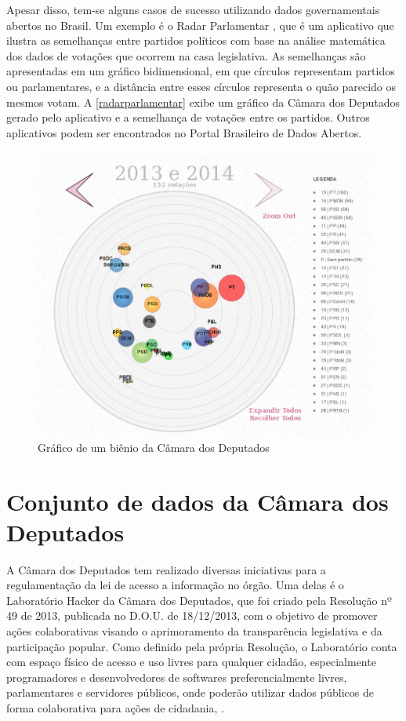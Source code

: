 \documentclass[
	12pt,				%
	openright,			%
	twoside,			%
	a4paper,			%
	english,			%
	french,				%
	spanish,			%
	brazil				%
	]{abntex2}
\begin{document}
Apesar disso, tem-se alguns casos de sucesso utilizando dados governamentais abertos no Brasil. Um exemplo é o Radar Parlamentar
, que é um aplicativo que ilustra as semelhanças entre partidos políticos com base na análise matemática dos 
dados de votações que ocorrem na casa legislativa. As semelhanças são apresentadas em um gráfico bidimensional, em que círculos 
representam partidos ou parlamentares, e a distância entre esses círculos representa o quão parecido os mesmos votam. A 
\autoref{radarparlamentar} exibe um gráfico da Câmara dos Deputados gerado pelo aplicativo e a semelhança de votações entre os
partidos. Outros aplicativos podem ser encontrados no Portal Brasileiro de Dados Abertos.

\begin{figure}[htb]
	\caption{\label{radarparlamentar}Gráfico de um biênio da Câmara dos Deputados}
	\begin{center}
	    \includegraphics[scale=0.5]{radarparlamentar.png}
	\end{center}
\end{figure}

\chapter{Conjunto de dados da Câmara dos Deputados} 
A Câmara dos Deputados tem realizado diversas iniciativas para a regulamentação da lei de acesso a informação no órgão. 
Uma delas é o Laboratório Hacker da Câmara dos Deputados, que foi criado pela Resolução nº 49 de 2013, publicada no D.O.U. 
de 18/12/2013, com o objetivo de promover ações colaborativas visando o aprimoramento da transparência legislativa e da 
participação popular. Como definido pela própria Resolução, o Laboratório conta com espaço físico de acesso e uso livres 
para qualquer cidadão, especialmente programadores e desenvolvedores de softwares preferencialmente livres, parlamentares e 
servidores públicos, onde poderão utilizar dados públicos de forma colaborativa para ações de cidadania, .
\end{document}
